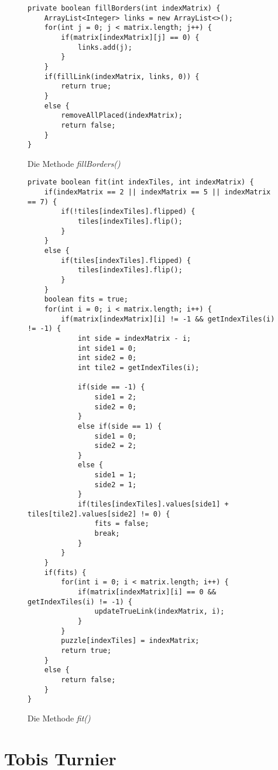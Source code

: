 \documentclass[a4paper, 12pt]{scrartcl}
\begin{document}
\begin{figure}[H]
    \centering
    \begin{lstlisting}
private boolean fillBorders(int indexMatrix) {
    ArrayList<Integer> links = new ArrayList<>();
    for(int j = 0; j < matrix.length; j++) {
        if(matrix[indexMatrix][j] == 0) {
            links.add(j);
        }
    }
    if(fillLink(indexMatrix, links, 0)) {
        return true;
    }
    else {
        removeAllPlaced(indexMatrix);
        return false;
    }
}
    \end{lstlisting}
    \caption{Die Methode \emph{fillBorders()}}
\end{figure}

\begin{figure}[H]
    \centering
    \begin{lstlisting}
private boolean fit(int indexTiles, int indexMatrix) {
    if(indexMatrix == 2 || indexMatrix == 5 || indexMatrix == 7) {
        if(!tiles[indexTiles].flipped) {
            tiles[indexTiles].flip();
        }
    }
    else {
        if(tiles[indexTiles].flipped) {
            tiles[indexTiles].flip();
        }
    }
    boolean fits = true;
    for(int i = 0; i < matrix.length; i++) {
        if(matrix[indexMatrix][i] != -1 && getIndexTiles(i) != -1) {
            int side = indexMatrix - i;
            int side1 = 0;
            int side2 = 0;
            int tile2 = getIndexTiles(i);
            
            if(side == -1) {
                side1 = 2;
                side2 = 0;
            }
            else if(side == 1) {
                side1 = 0;
                side2 = 2;
            }
            else {
                side1 = 1;
                side2 = 1;
            }
            if(tiles[indexTiles].values[side1] + tiles[tile2].values[side2] != 0) {
                fits = false;
                break;
            }
        }
    }
    if(fits) {
        for(int i = 0; i < matrix.length; i++) {
            if(matrix[indexMatrix][i] == 0 && getIndexTiles(i) != -1) {
                updateTrueLink(indexMatrix, i);
            }
        }
        puzzle[indexTiles] = indexMatrix;
        return true;
    }
    else {
        return false;
    }
}
    \end{lstlisting}
    \caption{Die Methode \emph{fit()}}
\end{figure}

\section{Tobis Turnier}
\end{document}
